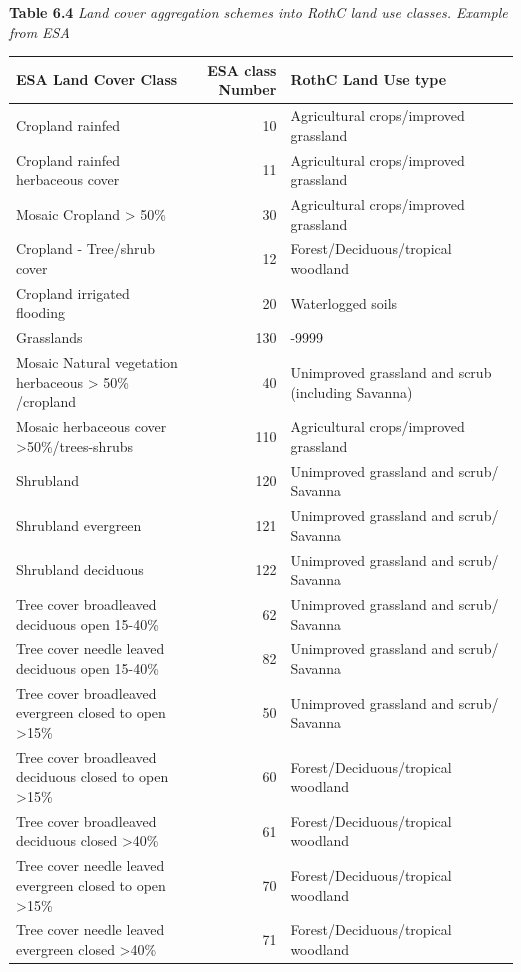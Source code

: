 \documentclass[
  10pt,
  b5paper,
]{book}
\begin{document}
\textbf{Table 6.4} \emph{Land cover aggregation schemes into RothC land use classes. Example from ESA}

\begin{table}
\centering
\begin{tabular}{l|r|l}
\hline
ESA Land Cover Class & ESA class Number & RothC Land Use type\\
\hline
Cropland rainfed & 10 & Agricultural crops/improved grassland\\
\hline
Cropland rainfed herbaceous cover & 11 & Agricultural crops/improved grassland\\
\hline
Mosaic Cropland > 50\% & 30 & Agricultural crops/improved grassland\\
\hline
Cropland  - Tree/shrub cover & 12 & Forest/Deciduous/tropical woodland\\
\hline
Cropland irrigated flooding & 20 & Waterlogged soils\\
\hline
Grasslands & 130 & -9999\\
\hline
Mosaic Natural vegetation herbaceous > 50\% /cropland & 40 & Unimproved grassland and scrub (including Savanna)\\
\hline
Mosaic herbaceous cover >50\%/trees-shrubs & 110 & Agricultural crops/improved grassland\\
\hline
Shrubland & 120 & Unimproved grassland and scrub/ Savanna\\
\hline
Shrubland evergreen & 121 & Unimproved grassland and scrub/ Savanna\\
\hline
Shrubland deciduous & 122 & Unimproved grassland and scrub/ Savanna\\
\hline
Tree cover broadleaved deciduous open 15-40\% & 62 & Unimproved grassland and scrub/ Savanna\\
\hline
Tree cover needle leaved deciduous  open 15-40\% & 82 & Unimproved grassland and scrub/ Savanna\\
\hline
Tree cover broadleaved evergreen closed to open >15\% & 50 & Unimproved grassland and scrub/ Savanna\\
\hline
Tree cover broadleaved deciduous closed to open >15\% & 60 & Forest/Deciduous/tropical woodland\\
\hline
Tree cover broadleaved deciduous closed >40\% & 61 & Forest/Deciduous/tropical woodland\\
\hline
Tree cover needle leaved evergreen closed to open >15\% & 70 & Forest/Deciduous/tropical woodland\\
\hline
Tree cover needle leaved evergreen closed >40\% & 71 & Forest/Deciduous/tropical woodland\\

\end{tabular}
\end{table}
\end{document}
